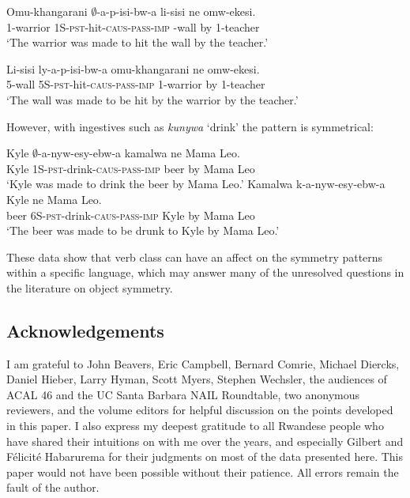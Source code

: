 \documentclass[output=paper]{langsci/langscibook}
\begin{document}
  
 \begin{exe}
%
\ex\label{anything2}
\begin{xlist}
\ex\gll Omu-khangarani $\emptyset$-a-p-isi-bw-a li-sisi ne omw-ekesi.\\
	{\scshape 1-}warrior {\scshape 1S-pst-}hit-{\scshape caus-pass-imp} {-}wall by {\scshape 1}-teacher\\
	\glt `The warrior was made to hit the wall by the teacher.'

\ex \gll {\bad}Li-sisi ly-a-p-isi-bw-a omu-khangarani ne omw-ekesi.\\
		{\scshape 5}-wall {\scshape 5S-pst}-hit-{\scshape caus-pass-imp} {\scshape 1-}warrior by {\scshape 1-}teacher\\
		\glt `The wall was made to be hit by the warrior by the teacher.'
		

\end{xlist}
\end{exe}
%
 However, with ingestives such as \emph{kunywa} `drink' the pattern is
symmetrical:
%
\begin{exe}
\ex\label{beer}\begin{xlist}
\ex\gll Kyle $\emptyset$-a-nyw-esy-ebw-a kamalwa ne Mama Leo.\\
		Kyle {\scshape 1S-pst-}drink-{\scshape caus-pass-imp} beer by Mama Leo\\
		\glt `Kyle was made to drink the beer by Mama Leo.'
\ex\gll Kamalwa k-a-nyw-esy-ebw-a Kyle ne Mama Leo.\\
			beer {\scshape 6S-pst-}drink-{\scshape caus-pass-imp} Kyle by Mama Leo\\
			\glt `The beer was made to be drunk to Kyle by Mama Leo.'
\end{xlist}
\end{exe}

 These data show that verb class can have an affect on the symmetry patterns within a specific language, which may answer many of the unresolved questions in the literature on object symmetry. 

\fi
  

 
 
\iffalse 
appl constraint: 
if $\beta$ is the sum of the lexical entailments of the arguments \{x_1 ... x_n\} of a verb, and $\phi$ = $\alpha$($\beta$), $\phi$ = 1 iff $\phi \noteq \beta$ and 
\fi 



\subsection*{Acknowledgements}
I am grateful to John Beavers, Eric Campbell, Bernard Comrie, Michael Diercks, Daniel Hieber, Larry Hyman, Scott Myers, Stephen Wechsler, the audiences of ACAL 46 and the UC Santa Barbara NAIL Roundtable, two anonymous reviewers, and the volume editors for helpful discussion on the points developed in this paper. I also express my deepest gratitude to all Rwandese people who have shared their intuitions on  with me over the years, and especially Gilbert and Félicité Habarurema for their judgments on most of the data presented here. This paper would not have been possible without their patience. All errors remain the fault of the author.
\end{document}

